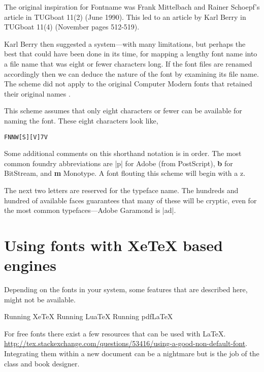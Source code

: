 The original inspiration for Fontname was Frank Mittelbach and Rainer Schoepf's article in TUGboat 11(2) (June 1990). This led to an article by Karl Berry in TUGboat 11(4) (November pages 512-519).

Karl Berry then suggested a system---with many limitations, but perhaps the best that could have been done in its time, for mapping a lengthy font name into a file name that was eight or fewer characters long. If the font files are renamed accordingly then we can deduce the nature of the font by examining its file name. The scheme did not apply to the original Computer Modern fonts that retained their original names \citep{fontname}.

This scheme assumes that only eight characters or fewer can be available for naming the font. These eight characters look like,

\begin{verbatim}
FNNW[S][V]7V
\end{verbatim}

Some additional comments on this shorthand notation is in order. 
The most common foundry abbreviations are |p| for Adobe (from PostScript), \textbf{b} for BitStream, and \textbf{m} Monotype. A font flouting this scheme will begin with a z.

The next two letters are reserved for the typeface name. The hundreds and hundred of available faces guarantees  that many of these will be cryptic, even for the most common typefaces---Adobe Garamond is |ad|. 



\section{Using fonts with XeTeX based engines}

Depending on the fonts in your system, some features that are described here, might not be available.

\begin{texexample}{}{}
\ifxetex
  Running XeTeX
\else
  \ifluatex
    Running LuaTeX
  \else
    Running pdfLaTeX
  \fi
\fi
\end{texexample}

For free fonts there exist a few resources that can be used with \LaTeX.
\url{http://tex.stackexchange.com/questions/53416/using-a-good-non-default-font}. Integrating them within a new document can be a nightmare but is the job of the class and book designer.

